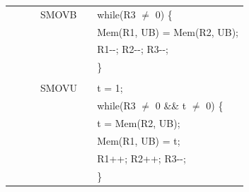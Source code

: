 \begin{table}
\begin{subtable}{\linewidth}
\begin{center}
\begin{tabular}{llllll}
                   &                   &                                       & SMOVB             & \flags{----}      & while(R3 $\ne$ 0) \{                                                          \\
                   &                   &                                       &                   &                   & \quad Mem(R1, UB) = Mem(R2, UB);                                              \\
                   &                   &                                       &                   &                   & \quad R1-{}-; R2-{}-; R3-{}-;                                                 \\
                   &                   &                                       &                   &                   & \}                                                                            \\
                   &                   &                                       &                   &                   &                                                                               \\
                   &                   &                                       & SMOVU             & \flags{----}      & t = 1;                                                                        \\
                   &                   &                                       &                   &                   & while(R3 $\ne$ 0 \&\& t $\ne$ 0) \{                                           \\
                   &                   &                                       &                   &                   & \quad t = Mem(R2, UB);                                                        \\
                   &                   &                                       &                   &                   & \quad Mem(R1, UB) = t;                                                        \\
                   &                   &                                       &                   &                   & \quad R1++; R2++; R3-{}-;                                                     \\
                   &                   &                                       &                   &                   & \}                                                                            \\

\end{tabular}
\end{center}
\end{subtable}
\end{table}
